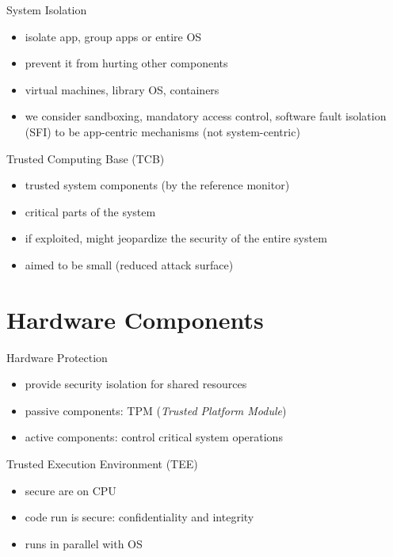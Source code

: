 \documentclass{curs}
\begin{document}
\begin{frame}{System Isolation}
  \begin{itemize}
    \item isolate app, group apps or entire OS
    \item prevent it from hurting other components
    \item virtual machines, library OS, containers
    \item we consider sandboxing, mandatory access control, software fault isolation (SFI) to be app-centric mechanisms (not system-centric)
  \end{itemize}
\end{frame}

\begin{frame}{Trusted Computing Base (TCB)}
  \begin{itemize}
    \item trusted system components (by the reference monitor)
    \item critical parts of the system
    \item if exploited, might jeopardize the security of the entire system
    \item aimed to be small (reduced attack surface)
  \end{itemize}
\end{frame}

\section{Hardware Components}

\begin{frame}{Hardware Protection}
  \begin{itemize}
    \item provide security isolation for shared resources
    \item passive components: TPM (\textit{Trusted Platform Module})
    \item active components: control critical system operations
  \end{itemize}
\end{frame}

\begin{frame}{Trusted Execution Environment (TEE)}
  \begin{itemize}
    \item secure are on CPU
    \item code run is secure: confidentiality and integrity
    \item runs in parallel with OS
  \end{itemize}
\end{frame}
\end{document}
